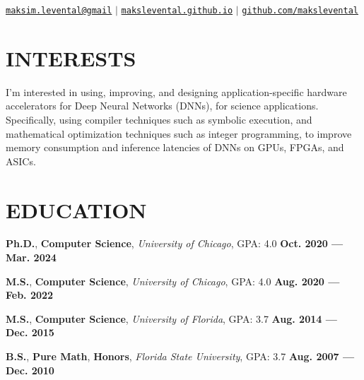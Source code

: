\documentclass[11pt,letterpaper,roman,colorlinks,linkcolor=blue]{moderncv}
\newcommand*{\modern}{\fontfamily{qhv}\selectfont}
\newcommand{\mystyle}[1]{\textcolor{mygrey}{\modern #1}}
\newcommand{\mysectionstyle}[1]{\large\mystyle{#1}}
\begin{document}
\makecvtitle

\vspace{-16mm}
\begin{center}
\mystyle{\href{maksim.levental@gmail.com}{\texttt{maksim.levental@gmail}} $|$ \href{https://makslevental.github.io/}{\texttt{makslevental.github.io}} $|$ \href{https://github.com/makslevental}{\texttt{github.com/makslevental}}}
\end{center}


\section{\mysectionstyle{INTERESTS}}

I'm interested in using, improving, and designing application-specific hardware accelerators for Deep Neural Networks (DNNs), for science applications. 
Specifically, using compiler techniques such as symbolic execution, and mathematical optimization techniques such as integer programming, to improve memory consumption and inference latencies of DNNs on GPUs, FPGAs, and ASICs. 


\section{\mysectionstyle{EDUCATION}}

\textbf{Ph.D.}, \textbf{Computer Science}, \emph{University of Chicago}, GPA: 4.0
\hfill \textbf{Oct. 2020 --- Mar. 2024}

\textbf{M.S.}, \textbf{Computer Science}, \emph{University of Chicago}, GPA: 4.0
\hfill \textbf{Aug. 2020 --- Feb. 2022}

\textbf{M.S.}, \textbf{Computer Science}, \emph{University of Florida}, GPA: 3.7
\hfill \textbf{Aug. 2014 --- Dec. 2015}

\textbf{B.S.}, \textbf{Pure Math}, \textbf{Honors}, \emph{Florida State University}, GPA: 3.7
\hfill \textbf{Aug. 2007 --- Dec. 2010}

\end{document}
